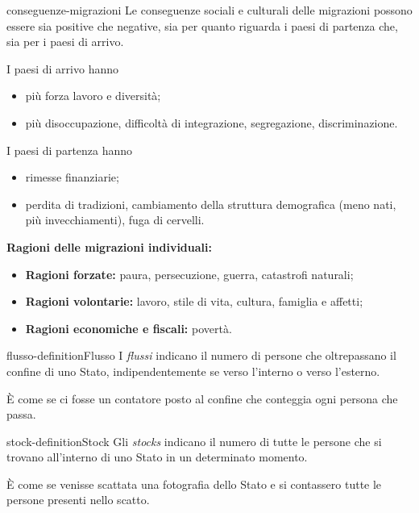 \documentclass[preview]{standalone}
\begin{document}
\begin{snippet}{conseguenze-migrazioni}
    Le conseguenze sociali e culturali delle migrazioni
    possono essere sia positive che negative, sia per quanto
    riguarda i paesi di partenza che, sia per i paesi di arrivo.
    
    I paesi di arrivo hanno
    \begin{itemize}
        \item \greenbox più forza lavoro e diversità;
        \item \redbox più disoccupazione, difficoltà di integrazione,
        segregazione, discriminazione.
    \end{itemize}
    
    I paesi di partenza hanno
    \begin{itemize}
        \item \greenbox rimesse finanziarie;
        \item \redbox perdita di tradizioni,
        cambiamento della struttura demografica (meno nati, più invecchiamenti),
        fuga di cervelli.
    \end{itemize}

    \textbf{Ragioni delle migrazioni individuali:}
    \begin{itemize}
        \item \textbf{Ragioni forzate:} paura, persecuzione, guerra, catastrofi naturali;
        \item \textbf{Ragioni volontarie:} lavoro, stile di vita, cultura, famiglia e affetti;
        \item \textbf{Ragioni economiche e fiscali:} povertà.
    \end{itemize}
\end{snippet}

\begin{snippetdefinition}{flusso-definition}{Flusso}
    I \textit{flussi} indicano il numero di persone che oltrepassano il confine di uno
    Stato, indipendentemente se verso l'interno o verso l'esterno.
\end{snippetdefinition}

\begin{plainhtml}
    È come se ci fosse un contatore posto al confine che conteggia ogni persona che passa.
\end{plainhtml}

\begin{snippetdefinition}{stock-definition}{Stock}
    Gli \textit{stocks} indicano il numero di tutte le persone che si trovano all'interno di uno Stato in un
    determinato momento.
\end{snippetdefinition}

\begin{plainhtml}
    È come se venisse scattata una fotografia dello Stato e si contassero
    tutte le persone presenti nello scatto.
\end{plainhtml}
\end{document}
